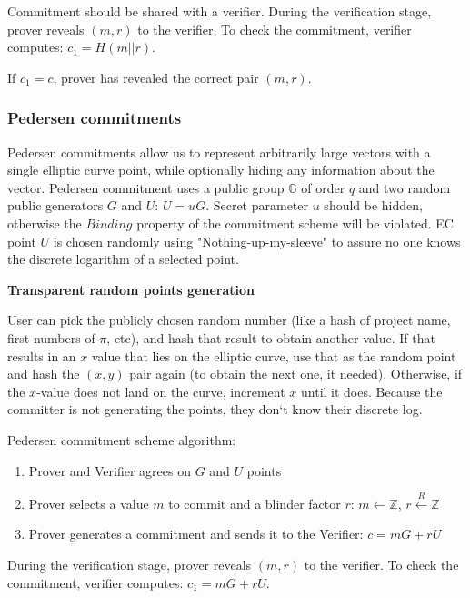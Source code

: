 \documentclass[../lecture-notes.tex]{subfiles}
\begin{document}
Commitment should be shared with a verifier. During the verification stage, prover reveals $(m, r)$ to the verifier. 
To check the commitment, verifier computes: $c_1 = H(m || r)$.

If $c_1 = c$, prover has revealed the correct pair $(m, r)$.

\subsubsection{Pedersen commitments}

Pedersen commitments allow us to represent arbitrarily large vectors with a single elliptic curve point, while optionally hiding any information about the vector. Pedersen commitment uses a public group $\mathbb{G}$ of order $q$ and two random public generators $G$ and $U$: $U = uG$. Secret parameter $u$ should be hidden, otherwise the $\textit{Binding}$ property of the commitment scheme will be violated.
EC point $U$ is chosen randomly using "Nothing-up-my-sleeve" to assure no one knows the discrete logarithm of a selected point.

\begin{remark}
    \textbf{Transparent random points generation}

    User can pick the publicly chosen random number (like a hash of project name, first numbers of $\pi$, etc), and hash that result to obtain another value. If that results in an $x$ value that lies on the elliptic curve, use that as the random point and hash the $(x, y)$ pair again (to obtain the next one, it needed). Otherwise, if the $x$-value does not land on the curve, increment $x$ until it does. Because the committer is not generating the points, they don`t know their discrete log. 
\end{remark}

Pedersen commitment scheme algorithm:
\begin{enumerate}
    \item Prover and Verifier agrees on $G$ and $U$ points
    \item Prover selects a value $m$ to commit and a blinder factor $r$:
            $m \leftarrow \mathbb{Z}$,
            $r \xleftarrow{R} \mathbb{Z}$
    \item Prover generates a commitment and sends it to the Verifier:
            $c = mG + rU$
\end{enumerate}

During the verification stage, prover reveals $(m, r)$ to the verifier. 
To check the commitment, verifier computes: $c_1 = mG + rU$.
\end{document}
